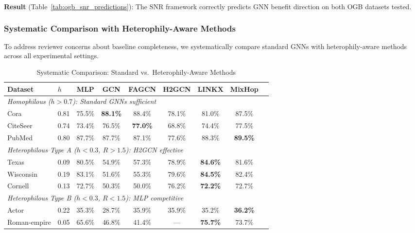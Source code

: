 \textbf{Result} (Table~\ref{tab:ogb_snr_predictions}): The SNR framework correctly predicts GNN benefit direction on both OGB datasets tested.

\subsubsection{Systematic Comparison with Heterophily-Aware Methods}

To address reviewer concerns about baseline completeness, we systematically compare standard GNNs with heterophily-aware methods across all experimental settings.

\begin{table}[t]
\centering
\caption{Systematic Comparison: Standard vs.\ Heterophily-Aware Methods}
\label{tab:heterophily_methods_comparison}
\small
\begin{tabular}{@{}llccccccc@{}}
\toprule
\textbf{Dataset} & $h$ & \textbf{MLP} & \textbf{GCN} & \textbf{FAGCN} & \textbf{H2GCN} & \textbf{LINKX} & \textbf{MixHop} \\
\midrule
\multicolumn{8}{l}{\textit{Homophilous ($h > 0.7$): Standard GNNs sufficient}} \\
Cora & 0.81 & 75.5\% & \textbf{88.1\%} & 88.4\% & 78.1\% & 81.0\% & 87.5\% \\
CiteSeer & 0.74 & 73.4\% & 76.5\% & \textbf{77.0\%} & 68.8\% & 74.4\% & 77.5\% \\
PubMed & 0.80 & 87.7\% & 87.7\% & 87.1\% & 77.6\% & 88.3\% & \textbf{89.5\%} \\
\midrule
\multicolumn{8}{l}{\textit{Heterophilous Type A ($h < 0.3$, $R > 1.5$): H2GCN effective}} \\
Texas & 0.09 & 80.5\% & 54.9\% & 57.3\% & 78.9\% & \textbf{84.6\%} & 81.6\% \\
Wisconsin & 0.19 & 83.1\% & 51.6\% & 55.3\% & 79.6\% & \textbf{84.5\%} & 82.4\% \\
Cornell & 0.13 & 72.7\% & 50.3\% & 50.0\% & 76.2\% & \textbf{72.2\%} & 72.7\% \\
\midrule
\multicolumn{8}{l}{\textit{Heterophilous Type B ($h < 0.3$, $R < 1.5$): MLP competitive}} \\
Actor & 0.22 & 35.3\% & 28.7\% & 35.9\% & 35.9\% & 35.2\% & \textbf{36.2\%} \\
Roman-empire & 0.05 & 65.6\% & 46.8\% & 41.4\% & --- & \textbf{75.7\%} & 73.7\% \\
\bottomrule
\end{tabular}
\end{table}

